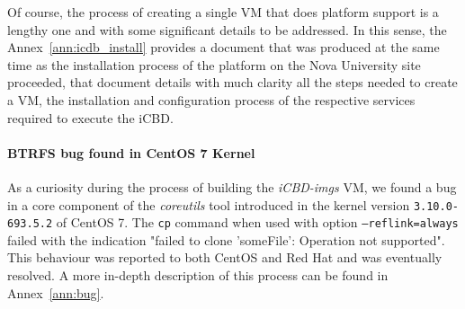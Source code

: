 Of course, the process of creating a single VM that does platform support is a lengthy one and with some significant details to be addressed. In this sense, the Annex~\ref{ann:icdb_install} provides a document that was produced at the same time as the installation process of the platform on the Nova University site proceeded, that document details with much clarity all the steps needed to create a VM, the installation and configuration process of the respective services required to execute the iCBD.

\paragraph{BTRFS bug found in CentOS 7 Kernel}
\label{par:impl_centos_bug}

As a curiosity during the process of building the \textit{iCBD-imgs} VM, we found a bug in a core component of the \textit{coreutils} tool introduced in the kernel version \texttt{3.10.0-693.5.2} of CentOS 7. The \texttt{cp} command when used with option \texttt{--reflink=always} failed with the indication "failed to clone 'someFile': Operation not supported". This behaviour was reported to both CentOS and Red Hat and was eventually resolved. A more in-depth description of this process can be found in Annex~\ref{ann:bug}.







